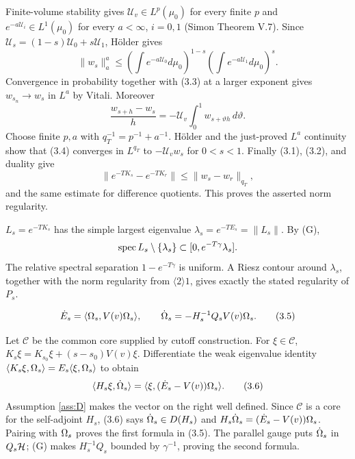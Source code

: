 \documentclass[11pt,a4paper]{article}
\begin{document}
Finite-volume stability gives $\mathcal U_v\in L^p(\mu_0)$ for every finite
$p$ and $e^{-a\mathcal U_i}\in L^1(\mu_0)$ for every $a<\infty$, $i=0,1$
(Simon Theorem V.7).  Since
$\mathcal U_s=(1-s)\mathcal U_0+s\mathcal U_1$, H\"older gives
\[
 \|w_s\|_a^a\leq
 \left(\int e^{-a\mathcal U_0}d\mu_0\right)^{1-s}
 \left(\int e^{-a\mathcal U_1}d\mu_0\right)^s.                    \tag{3.3}
\]
Convergence in probability together with (3.3) at a larger exponent gives
$w_{s_n}\to w_s$ in $L^a$ by Vitali.  Moreover
\[
 \frac{w_{s+h}-w_s}{h}
 =-\mathcal U_v\int_0^1w_{s+\vartheta h}\,d\vartheta.              \tag{3.4}
\]
Choose finite $p,a$ with $q_T^{-1}=p^{-1}+a^{-1}$.  H\"older and the just-proved
$L^a$ continuity show that (3.4) converges in $L^{q_T}$ to
$-\mathcal U_vw_s$ for $0<s<1$.  Finally (3.1), (3.2), and duality give
\[
 \|e^{-TK_s}-e^{-TK_r}\|\leq\|w_s-w_r\|_{q_T},
\]
and the same estimate for difference quotients.  This proves the asserted norm
regularity.


\Because $L_s=e^{-TK_s}$ has the simple largest eigenvalue
$\lambda_s=e^{-TE_s}=\|L_s\|$.  By (G),
\[
 \operatorname{spec} L_s\setminus\{\lambda_s\}\subset[0,e^{-T\gamma}\lambda_s].
\]
The relative spectral separation $1-e^{-T\gamma}$ is uniform.  A Riesz contour
around $\lambda_s$, together with the norm regularity from $\langle2\rangle1$,
gives exactly the stated regularity of $P_s$.

\[
 \dot E_s=\langle \Omega_s,V(v)\Omega_s\rangle,\qquad
 \dot{\Omega}_s=-H_s^{-1}Q_sV(v)\Omega_s.                                 \tag{3.5}
\]

\Because Let $\mathscr C$ be the common core supplied by cutoff construction.
For $\xi\in\mathscr C$,
$K_s\xi=K_{s_0}\xi+(s-s_0)V(v)\xi$.  Differentiate the weak eigenvalue identity
$\langle K_s\xi,\Omega_s\rangle=E_s\langle \xi,\Omega_s\rangle$ to obtain
\[
 \langle H_s\xi,\dot{\Omega}_s\rangle=\langle \xi,(\dot E_s-V(v))\Omega_s\rangle.           \tag{3.6}
\]
Assumption \ref{ass:D} makes the vector on the right well defined.  Since
$\mathscr C$ is a core for the self-adjoint $H_s$, (3.6) says
$\dot{\Omega}_s\in D(H_s)$ and
$H_s\dot{\Omega}_s=(\dot E_s-V(v))\Omega_s$.  Pairing with $\Omega_s$ proves the first
formula in (3.5).  The parallel gauge puts $\dot{\Omega}_s$ in $Q_s\mathcal H$; (G) makes
$H_s^{-1}Q_s$ bounded by $\gamma^{-1}$, proving the second formula.

\QedStep
\end{document}
